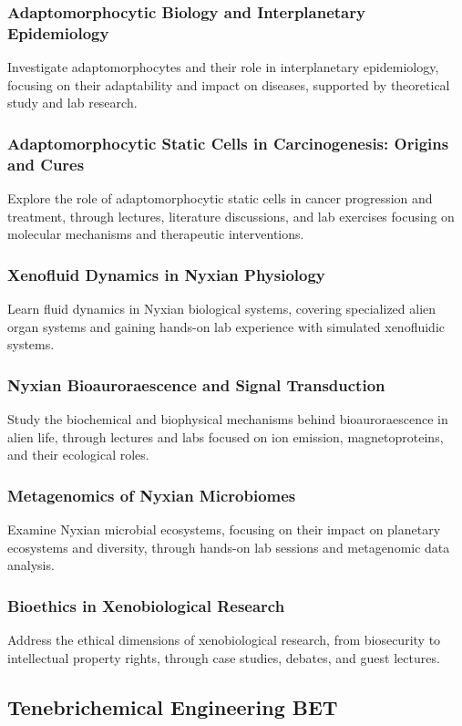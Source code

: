 \subsubsection{Adaptomorphocytic Biology and Interplanetary Epidemiology}
Investigate adaptomorphocytes and their role in interplanetary epidemiology, focusing on their adaptability and impact on diseases, supported by theoretical study and lab research.
\subsubsection{Adaptomorphocytic Static Cells in Carcinogenesis: Origins and Cures}
Explore the role of adaptomorphocytic static cells in cancer progression and treatment, through lectures, literature discussions, and lab exercises focusing on molecular mechanisms and therapeutic interventions.
\subsubsection{Xenofluid Dynamics in Nyxian Physiology}
Learn fluid dynamics in Nyxian biological systems, covering specialized alien organ systems and gaining hands-on lab experience with simulated xenofluidic systems.
\subsubsection{Nyxian Bioauroraescence and Signal Transduction}
Study the biochemical and biophysical mechanisms behind bioauroraescence in alien life, through lectures and labs focused on ion emission, magnetoproteins, and their ecological roles.
\subsubsection{Metagenomics of Nyxian Microbiomes}
Examine Nyxian microbial ecosystems, focusing on their impact on planetary ecosystems and diversity, through hands-on lab sessions and metagenomic data analysis.
\subsubsection{Bioethics in Xenobiological Research}
Address the ethical dimensions of xenobiological research, from biosecurity to intellectual property rights, through case studies, debates, and guest lectures.

\subsection{Tenebrichemical Engineering \hfill BET}
